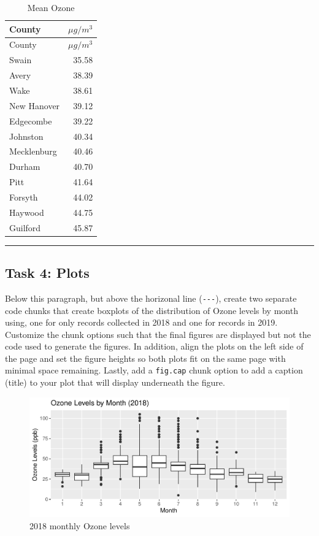 \documentclass[
]{article}
\begin{document}
\begin{longtable}[]{@{}lr@{}}
\caption{Mean Ozone}\tabularnewline
\toprule\noalign{}
County & \(\mu g/m^3\) \\
\midrule\noalign{}
\endfirsthead
\toprule\noalign{}
County & \(\mu g/m^3\) \\
\midrule\noalign{}
\endhead
\bottomrule\noalign{}
\endlastfoot
Swain & 35.58 \\
Avery & 38.39 \\
Wake & 38.61 \\
New Hanover & 39.12 \\
Edgecombe & 39.22 \\
Johnston & 40.34 \\
Mecklenburg & 40.46 \\
Durham & 40.70 \\
Pitt & 41.64 \\
Forsyth & 44.02 \\
Haywood & 44.75 \\
Guilford & 45.87 \\
\end{longtable}

\begin{center}\rule{0.5\linewidth}{0.5pt}\end{center}

\subsection{Task 4: Plots}\label{task-4-plots}

Below this paragraph, but above the horizonal line (\texttt{-\/-\/-}),
create two separate code chunks that create boxplots of the distribution
of Ozone levels by month using, one for only records collected in 2018
and one for records in 2019. Customize the chunk options such that the
final figures are displayed but not the code used to generate the
figures. In addition, align the plots on the left side of the page and
set the figure heights so both plots fit on the same page with minimal
space remaining. Lastly, add a \texttt{fig.cap} chunk option to add a
caption (title) to your plot that will display underneath the figure.

\begin{figure}

\includegraphics{LeahLi_A06_Crafting_Reports_files/figure-latex/ozone_2018-1} \hfill{}

\caption{2018 monthly Ozone levels}\label{fig:ozone_2018}
\end{figure}
\end{document}

